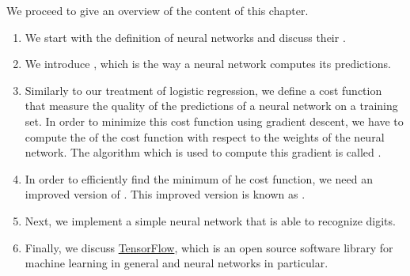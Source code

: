 We proceed to give an overview of the content of this chapter.
\begin{enumerate}
\item We start with the definition of  neural networks and discuss their .
\item We introduce , which is the way a neural network computes its predictions.
\item Similarly to our treatment of logistic regression, we define a cost function that measure the quality of
      the predictions of a neural network on a training set.  In order to minimize this cost function using
      gradient descent, we have to compute the  of the cost function with respect to the weights of the
      neural network.  The algorithm which is used to compute this gradient is called .
\item In order to efficiently find the minimum of he cost function, we need an improved version of
      .  This improved version is known as .
\item Next, we implement a simple neural network that is able to recognize digits.
\item Finally, we discuss \href{https://www.tensorflow.org}{TensorFlow}, which is an open source software
      library for machine learning in general and neural networks in particular.
\end{enumerate}


